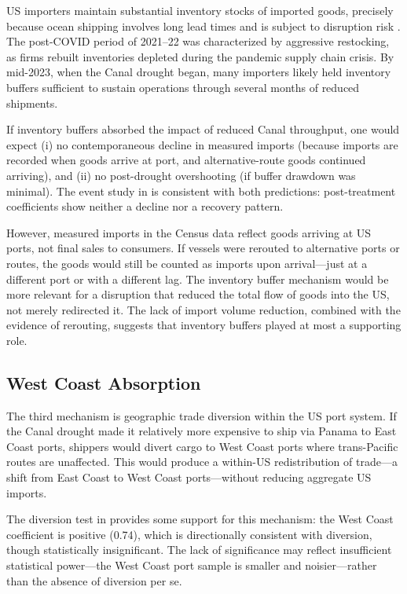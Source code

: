 \documentclass[12pt]{article}
\begin{document}
US importers maintain substantial inventory stocks of imported goods, precisely because ocean shipping involves long lead times and is subject to disruption risk \citep{alessandria2010inventories}. The post-COVID period of 2021--22 was characterized by aggressive restocking, as firms rebuilt inventories depleted during the pandemic supply chain crisis. By mid-2023, when the Canal drought began, many importers likely held inventory buffers sufficient to sustain operations through several months of reduced shipments.

If inventory buffers absorbed the impact of reduced Canal throughput, one would expect (i) no contemporaneous decline in measured imports (because imports are recorded when goods arrive at port, and alternative-route goods continued arriving), and (ii) no post-drought overshooting (if buffer drawdown was minimal). The event study in  is consistent with both predictions: post-treatment coefficients show neither a decline nor a recovery pattern.

However, measured imports in the Census data reflect goods arriving at US ports, not final sales to consumers. If vessels were rerouted to alternative ports or routes, the goods would still be counted as imports upon arrival---just at a different port or with a different lag. The inventory buffer mechanism would be more relevant for a disruption that reduced the total flow of goods into the US, not merely redirected it. The lack of import volume reduction, combined with the evidence of rerouting, suggests that inventory buffers played at most a supporting role.

\subsection{West Coast Absorption}

The third mechanism is geographic trade diversion within the US port system. If the Canal drought made it relatively more expensive to ship via Panama to East Coast ports, shippers would divert cargo to West Coast ports where trans-Pacific routes are unaffected. This would produce a within-US redistribution of trade---a shift from East Coast to West Coast ports---without reducing aggregate US imports.

The diversion test in  provides some support for this mechanism: the West Coast coefficient is positive (0.74), which is directionally consistent with diversion, though statistically insignificant. The lack of significance may reflect insufficient statistical power---the West Coast port sample is smaller and noisier---rather than the absence of diversion per se.
\end{document}
